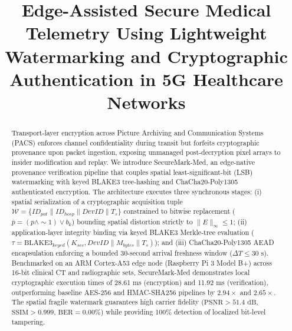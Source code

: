 \documentclass[runningheads]{llncs}
\begin{document}
\linespread{0.93}\selectfont

\title{Edge-Assisted Secure Medical Telemetry Using Lightweight Watermarking and Cryptographic Authentication in 5G Healthcare Networks}

\author{}
\authorrunning{}

\institute{}

\maketitle

\begin{abstract}
Transport-layer encryption across Picture Archiving and Communication Systems (PACS) enforces channel confidentiality during transit but forfeits cryptographic provenance upon packet ingestion, exposing unmanaged post-decryption pixel arrays to insider modification and replay. We introduce SecureMark-Med, an edge-native provenance verification pipeline that couples spatial least-significant-bit (LSB) watermarking with keyed BLAKE3 tree-hashing and ChaCha20-Poly1305 authenticated encryption. The architecture executes three synchronous stages: (i) spatial serialization of a cryptographic acquisition tuple $\mathcal{W} = \{ID_{pat} \parallel ID_{hosp} \parallel DevID \parallel T_s\}$ constrained to bitwise replacement ($\overline{p} = (p \land \sim 1) \lor b_k$) bounding spatial distortion strictly to $\lVert E \rVert_{\infty} \le 1$; (ii) application-layer integrity binding via keyed BLAKE3 Merkle-tree evaluation ($\tau = \text{BLAKE3}_{keyed}(K_{sec}, DevID \parallel M_{bytes} \parallel T_s)$); and (iii) ChaCha20-Poly1305 AEAD encapsulation enforcing a bounded 30-second arrival freshness window ($\Delta T \le 30\text{ s}$). Benchmarked on an ARM Cortex-A53 edge node (Raspberry Pi 3 Model B+) across 16-bit clinical CT and radiographic sets, SecureMark-Med demonstrates local cryptographic execution times of 28.61 ms (encryption) and 11.92 ms (verification), outperforming baseline AES-256 and HMAC-SHA256 pipelines by $2.94\times$ and $2.65\times$. The spatial fragile watermark guarantees high carrier fidelity ($\text{PSNR} > 51.4\text{ dB}$, $\text{SSIM} > 0.999$, $\text{BER} = 0.00\%$) while providing 100\% detection of localized bit-level tampering.
\end{abstract}
\end{document}
